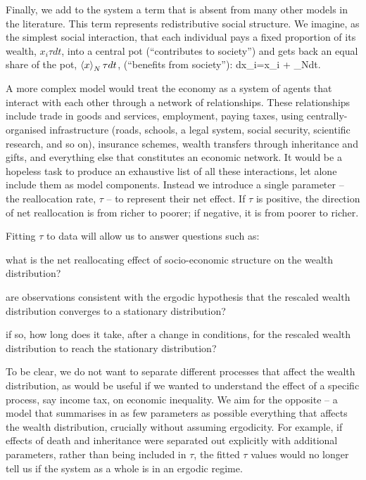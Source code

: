 Finally, we add to the system a term that is absent from many other models in the literature. This term represents redistributive social structure. We imagine, as the simplest social interaction, that each individual pays a fixed proportion of its wealth, $x_i \tau dt$, into a central pot (``contributes to society'') and gets back an equal share of the pot, $\left\langle x \right\rangle_N\tau dt$, (``benefits from society''):
\be
dx_i=x_i + _N\tau dt.
\ee

A more complex model would treat the economy as a system of agents that interact with each other through a network of relationships. These relationships include trade in goods and services, employment, paying taxes, using centrally-organised infrastructure (roads, schools, a legal system, social security, scientific research, and so on), insurance schemes, wealth transfers through inheritance and gifts, and everything else that constitutes an economic network. It would be a hopeless task to produce an exhaustive list of all these interactions, let alone include them as model components. Instead we introduce a single parameter -- the reallocation rate, $\tau$ -- to represent their net effect. If $\tau$ is positive, the direction of net reallocation is from richer to poorer; if negative, it is from poorer to richer.

Fitting $\tau$ to data will allow us to answer questions such as:
\bi
\item
what is the
net reallocating effect of socio-economic structure on the wealth distribution?
\item
are observations consistent with the ergodic hypothesis that the rescaled wealth distribution converges to a stationary distribution?
\item
if so, how long does it take, after a change in conditions, for the rescaled wealth distribution to reach the stationary distribution?
\ei

To be clear, we do not want to separate different processes that affect the wealth distribution, as would be useful if we wanted to understand the effect of a specific process, say income tax, on economic inequality. We aim for the opposite -- a model that summarises in as few parameters as possible everything that affects the wealth distribution, crucially without assuming ergodicity. For example, if effects of death and inheritance were separated out explicitly with additional parameters, rather than being included in $\tau$, the fitted $\tau$ values would no longer tell us if the system as a whole is in an ergodic regime.

